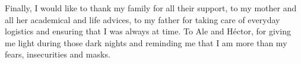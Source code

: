 Finally, I would like to thank my family for all their support, to my mother and all her academical and life advices, to my father for taking care of everyday logistics and ensuring that I was always at time. To Ale and Héctor, for giving me light during those dark nights and reminding me that I am more than my fears, insecurities and masks.

